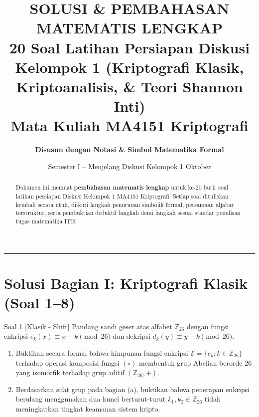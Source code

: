 \documentclass[11pt,a4paper]{article}
\title{\vspace{-1.2cm}\textbf{\Large SOLUSI \& PEMBAHASAN MATEMATIS LENGKAP}\\\large 20 Soal Latihan Persiapan Diskusi Kelompok 1 (Kriptografi Klasik, Kriptoanalisis, \& Teori Shannon Inti)\\\large\textbf{Mata Kuliah MA4151 Kriptografi}}
\author{\textbf{Disusun dengan Notasi \& Simbol Matematika Formal}}
\date{Semester I -- Menjelang Diskusi Kelompok 1 Oktober}
\begin{document}
\maketitle
\vspace{-0.5cm}

\begin{abstract}
Dokumen ini memuat \textbf{pembahasan matematis lengkap} untuk ke-20 butir soal latihan persiapan Diskusi Kelompok 1 MA4151 Kriptografi. Setiap soal dituliskan kembali secara utuh, diikuti langkah penurunan simbolik formal, persamaan aljabar terstruktur, serta pembuktian deduktif langkah demi langkah sesuai standar penulisan tugas matematika ITB.
\end{abstract}

\vspace{0.2cm}
\hrule
\vspace{0.3cm}

\tableofcontents
\newpage

\section{Solusi Bagian I: Kriptografi Klasik (Soal 1--8)}

\begin{soalklasik}{Soal 1 [Klasik - Shift]}
Pandang sandi geser atas alfabet $\mathbb{Z}_{26}$ dengan fungsi enkripsi $e_k(x) \equiv x + k \pmod{26}$ dan dekripsi $d_k(y) \equiv y - k \pmod{26}$.
\begin{enumerate}[label=(\alph*)]
    \item Buktikan secara formal bahwa himpunan fungsi enkripsi $\mathcal{E} = \{e_k : k \in \mathbb{Z}_{26}\}$ terhadap operasi komposisi fungsi $(\circ)$ membentuk grup Abelian berorde 26 yang isomorfik terhadap grup aditif $(\mathbb{Z}_{26}, +)$.
    \item Berdasarkan sifat grup pada bagian (a), buktikan bahwa penerapan enkripsi berulang menggunakan dua kunci berturut-turut $k_1, k_2 \in \mathbb{Z}_{26}$ tidak meningkatkan tingkat keamanan sistem kripto.
\end{enumerate}
\end{soalklasik}
\end{document}
